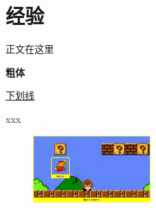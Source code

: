 \documentclass[../main.tex]{subfiles}
\begin{document}
\chapter{经验}

正文在这里

\textbf{粗体}

\uline{下划线}

xxx

\begin{figure}
\centering
\includegraphics[width=0.4\textwidth]{figures/agentenv.png}
\end{figure}
\end{document}
